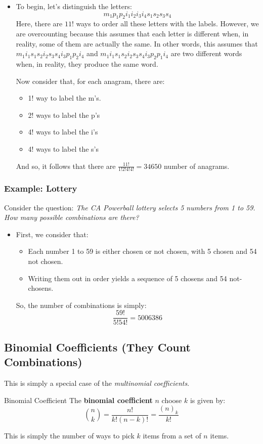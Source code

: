 \documentclass[letterpaper]{article}
\begin{document}
\begin{itemize}
    \item To begin, let's distinguish the letters:
    \[ m_1 p_1 p_2 i_1 i_2 i_3 i_4 s_1 s_2 s_3 s_4\]
    Here, there are $11!$ ways to order all these letters with the labels. However, we are overcounting because this assumes that each letter is different when, in reality, some of them are actually the same. In other words, this assumes that $m_1 i_1 s_1 s_2 i_2 s_3 s_4 i_3 p_1 p_2 i_4$ and $m_1 i_1 s_1 s_2 i_2 s_3 s_4 i_3 p_2 p_1 i_4$ are two different words when, in reality, they produce the same word.  
    
    \bigskip 
    
    Now consider that, for each anagram, there are:
    \begin{itemize}
        \item 1! way to label the m's.
        \item 2! ways to label the p's
        \item 4! ways to label the i's 
        \item 4! ways to label the s's
    \end{itemize}
    
    And so, it follows that there are $\frac{11!}{1!2!4!4!} = \boxed{34650}$ number of anagrams.
\end{itemize}

\subsubsection{Example: Lottery}
Consider the question: \emph{The CA Powerball lottery selects 5 numbers from 1 to 59. How many possible combinations are there?}

\begin{itemize}
    \item First, we consider that:
    \begin{itemize}
        \item Each number 1 to 59 is either chosen or not chosen, with 5 chosen and 54 not chosen.
        \item Writing them out in order yields a sequence of 5 chosens and 54 not-chosens.
    \end{itemize}
    So, the number of combinations is simply:
    \[ \frac{59!}{5!54!} = \boxed{5006386} \]
    
\end{itemize}

\subsection{Binomial Coefficients (They Count Combinations)}
This is simply a special case of the \emph{multinomial coefficients}.
\begin{definition}{Binomial Coefficient}{}
    The \textbf{binomial coefficient} $n$ choose $k$ is given by:
    \[\binom{n}{k} = \frac{n!}{k!(n - k)!} = \frac{(n)_k}{k!}\]
\end{definition}
This is simply the number of ways to pick $k$ items from a set of $n$ items.
\end{document}
